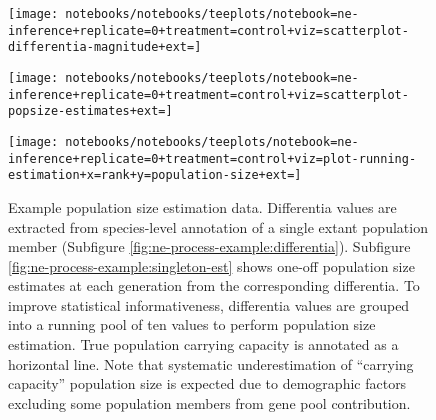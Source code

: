 \begin{figure}
  \centering

  \begin{minipage}{.65\textwidth}
    \centering
    \texttt{[image: notebooks/notebooks/teeplots/notebook=ne-inference+replicate=0+treatment=control+viz=scatterplot-differentia-magnitude+ext=]}
  \end{minipage}%
  \begin{minipage}{.25\textwidth}
    \label{fig:ne-process-example:differentia}
  \end{minipage}

  \vspace{0.25em}

  \begin{minipage}{.65\textwidth}
    \centering
    \texttt{[image: notebooks/notebooks/teeplots/notebook=ne-inference+replicate=0+treatment=control+viz=scatterplot-popsize-estimates+ext=]}
  \end{minipage}%
  \begin{minipage}{.25\textwidth}
    \label{fig:ne-process-example:singleton-est}
  \end{minipage}

  \vspace{0.25em}

  \begin{minipage}{.65\textwidth}
    \centering
    \texttt{[image: notebooks/notebooks/teeplots/notebook=ne-inference+replicate=0+treatment=control+viz=plot-running-estimation+x=rank+y=population-size+ext=]}
  \end{minipage}%
  \begin{minipage}{.25\textwidth}
    \label{fig:ne-process-example:running-est}
  \end{minipage}

  \caption{
    Example population size estimation data.
    Differentia values are extracted from species-level annotation of a single extant population member (Subfigure \ref{fig:ne-process-example:differentia}).
    Subfigure \ref{fig:ne-process-example:singleton-est} shows one-off population size estimates at each generation from the corresponding differentia.
    To improve statistical informativeness, differentia values are grouped into a running pool of ten values to perform population size estimation.
    True population carrying capacity is annotated as a horizontal line.
    Note that systematic underestimation of ``carrying capacity'' population size is expected due to demographic factors excluding some population members from gene pool contribution.
  }
  \label{fig:ne-process-example}
\end{figure}


